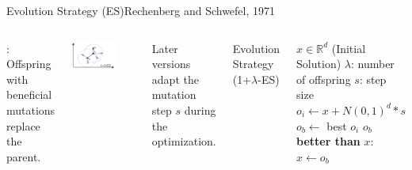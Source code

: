 \documentclass[aspectratio=169]{beamer}
\begin{document}
\begin{frame}{Evolution Strategy (ES)}{Rechenberg and Schwefel, 1971}
  \begin{columns}
    :
    Offspring with beneficial mutations replace the parent.\bigskip

    \begin{center}
      \includegraphics[width=0.7\textwidth]{img/ES_one_lambda.png}
    \end{center}

    Later versions adapt the mutation step $s$ during the optimization.


      Evolution Strategy (1+$\lambda$-ES)\bigskip

      \begin{algorithmic}[1]
        \Require $x \in \mathbb{R}^d$ (Initial Solution)
        \Require $\lambda$: number of offspring
        \Require $s$: step size
          \State $o_i \gets x + N(0,1)^d * s$
          \EndFor
          \State $o_b \gets$ best $o_i$
           $o_b$ {\bf better than} $x$: $x \gets o_b$
        \EndWhile
      \end{algorithmic}
  \end{columns}
\end{frame}
\end{document}
